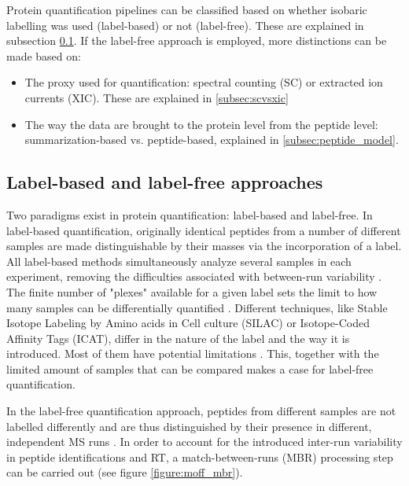 Protein quantification pipelines can be classified based on whether isobaric labelling was used (label-based) or not (label-free). These are explained in subsection \ref{subsec:labelling}. If the label-free approach is employed, more distinctions can be made based on:

\begin{itemize}
\item The proxy used for quantification: spectral counting (\ac{SC}) or extracted ion currents (\ac{XIC}). These are explained in \ref{subsec:scvsxic}


\item The way the data are brought to the protein level from the peptide level: summarization-based vs. peptide-based, explained in \ref{subsec:peptide_model}.
\end{itemize}

\subsection{Label-based and label-free approaches}
\label{subsec:labelling}


Two paradigms exist in protein quantification: label-based and label-free. In label-based quantification, originally identical peptides from a number of different samples are made distinguishable by their masses via the incorporation of a label. All label-based methods simultaneously analyze several samples in each experiment, removing the difficulties associated with between-run variability \cite{Barsnes2008}. The finite number of "plexes" available for a given label sets the limit to how many samples can be differentially quantified \cite{Cox2014}. Different techniques, like Stable Isotope Labeling by Amino acids in Cell culture (SILAC) or Isotope-Coded Affinity Tags (ICAT), differ in the nature of the label and the way it is introduced. Most of them have potential limitations \cite{Patel2009}. This, together with the limited amount of samples that can be compared makes a case for label-free quantification.

In the label-free quantification approach, peptides from different samples are not labelled differently and are thus distinguished by their presence in different, independent \ac{MS} runs \cite{Barsnes2008}. In order to account for the introduced inter-run variability in peptide identifications and \ac{RT}, a match-between-runs (MBR) processing step can be carried out (see figure \ref{figure:moff_mbr}). 


